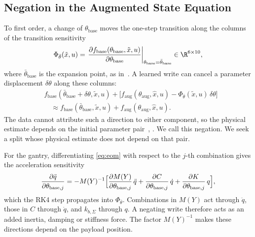 \subsection{Negation in the Augmented State Equation}\label{sec:obc_negation}
To first order, a change of $\theta_{\mathrm{base}}$ moves the one-step
transition along the columns of the transition sensitivity
\begin{equation}
 \Phi_{\bar\theta}(\tilde x,u)
 =\left.\frac{\partial f_{\mathrm{base}}(\theta_{\mathrm{base}},\tilde x,u)}
   {\partial\theta_{\mathrm{base}}}\right|_{\theta_{\mathrm{base}}=\bar\theta_{\mathrm{base}}}
   \in\R^{6\times10},
\label{eq:obc_sens}
\end{equation}
where $\bar\theta_{\mathrm{base}}$ is the expansion point, as
in~\cite[Eq.~(15)]{gyorok2025l4dc}.
A learned write can cancel a parameter displacement $\delta\theta$ along these
columns:
\begin{equation}
\begin{aligned}
 &f_{\mathrm{base}}(\bar\theta_{\mathrm{base}}+\delta\theta,\tilde x,u)
 +\bigl[f_{\mathrm{aug}}(\theta_{\mathrm{aug}},\hat x,u)
 -\Phi_{\bar\theta}(\tilde x,u)\,\delta\theta\bigr]\\
 &\quad\approx f_{\mathrm{base}}(\bar\theta_{\mathrm{base}},\tilde x,u)
 +f_{\mathrm{aug}}(\theta_{\mathrm{aug}},\hat x,u).
\end{aligned}
\label{eq:obc_negation}
\end{equation}
The data cannot attribute such a direction to either component, so the
physical estimate depends on the initial parameter
pair~\cite[Ex.~2]{gyorok2026obc}, \cite[Ex.~1]{gyorok2025l4dc}.
We call this negation.
We seek a split whose physical estimate does not depend on that pair.

For the gantry, differentiating \eqref{eq:eom} with respect to the $j$-th
combination gives the acceleration sensitivity
\begin{equation}
 \frac{\partial\ddot q}{\partial\theta_{\mathrm{base},j}}
 =-M(Y)^{-1}\Bigl[\frac{\partial M(Y)}{\partial\theta_{\mathrm{base},j}}\,\ddot q
 +\frac{\partial C}{\partial\theta_{\mathrm{base},j}}\,\dot q
 +\frac{\partial K}{\partial\theta_{\mathrm{base},j}}\,q\Bigr],
\label{eq:obc_gantry_sens}
\end{equation}
which the RK4 step propagates into $\Phi_{\bar\theta}$.
Combinations in $M(Y)$ act through $\ddot q$, those in $C$ through $\dot q$,
and $k_{b,\Sigma}$ through $q$.
A negating write therefore acts as an added inertia, damping or stiffness
force.
The factor $M(Y)^{-1}$ makes these directions depend on the payload position.

